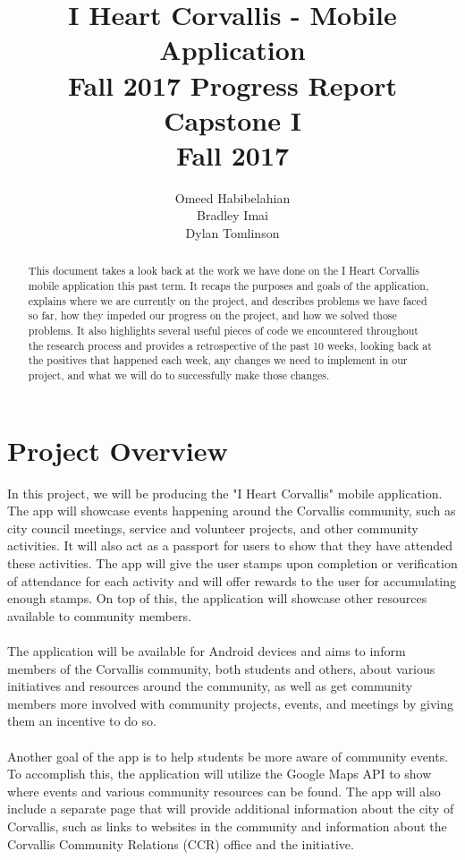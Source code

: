 \documentclass[draftclsnofoot, onecolumn, 10pt, compsoc]{IEEEtran}
\title{\textbf{I Heart Corvallis - Mobile Application
               \\Fall 2017 Progress Report}
               \\Capstone I
               \\Fall 2017}
\author{Omeed Habibelahian\\Bradley Imai\\Dylan Tomlinson}
\begin{document}
   \maketitle
   \begin{abstract}
      This document takes a look back at the work we have done on the I Heart Corvallis mobile application this past term. It recaps the purposes and goals of the application, explains where we are currently on the project, and describes problems we have faced so far, how they impeded our progress on the project, and how we solved those problems. It also highlights several useful pieces of code we encountered throughout the research process and provides a retrospective of the past 10 weeks, looking back at the positives that happened each week, any changes we need to implement in our project, and what we will do to successfully make those changes.
   \end{abstract}
   \newpage

   \tableofcontents
   \newpage

   \section{Project Overview}
   In this project, we will be producing the "I Heart Corvallis" mobile application. The app will showcase events happening around the Corvallis community, such as city council meetings, service and volunteer projects, and other community activities. It will also act as a passport for users to show that they have attended these activities. The app will give the user stamps upon completion or verification of attendance for each activity and will offer rewards to the user for accumulating enough stamps. On top of this, the application will showcase other resources available to community members. \\ \\
   The application will be available for Android devices and aims to inform members of the Corvallis community, both students and others, about various initiatives and resources around the community, as well as get community members more involved with community projects, events, and meetings by giving them an incentive to do so. \\ \\
   Another goal of the app is to help students be more aware of community events. To accomplish this, the application will utilize the Google Maps API to show where events and various community resources can be found. The app will also include a separate page that will provide additional information about the city of Corvallis, such as links to websites in the community and information about the Corvallis Community Relations (CCR) office and the initiative.
\end{document}
